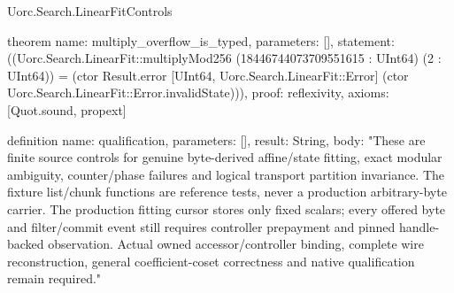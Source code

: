 \begin{lexlean}{Uorc.Search.LinearFitControls}
\begin{semanticmodule}
theorem{
  name: multiply_overflow_is_typed,
  parameters: [],
  statement: ((Uorc.Search.LinearFit::multiplyMod256 (18446744073709551615 : UInt64) (2 : UInt64)) = (ctor Result.error [UInt64, Uorc.Search.LinearFit::Error] (ctor Uorc.Search.LinearFit::Error.invalidState))),
  proof: reflexivity{},
  axioms: [Quot.sound, propext]
}

definition{
  name: qualification,
  parameters: [],
  result: String,
  body: "These are finite source controls for genuine byte-derived affine/state fitting, exact modular ambiguity, counter/phase failures and logical transport partition invariance. The fixture list/chunk functions are reference tests, never a production arbitrary-byte carrier. The production fitting cursor stores only fixed scalars; every offered byte and filter/commit event still requires controller prepayment and pinned handle-backed observation. Actual owned accessor/controller binding, complete wire reconstruction, general coefficient-coset correctness and native qualification remain required."
}
\end{semanticmodule}
\end{lexlean}
